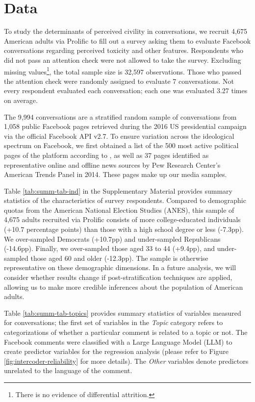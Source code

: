\documentclass{article}
\begin{document}
\section{Data}

To study the determinants of perceived civility in conversations, we recruit 4,675 American adults via Prolific to fill out a survey asking them to evaluate Facebook conversations regarding perceived toxicity and other features. Respondents who did not pass an attention check were not allowed to take the survey. Excluding missing values\footnote{There is no evidence of differential attrition.}, the total sample size is 32,597 observations. Those who passed the attention check were randomly assigned to evaluate 7 conversations. Not every respondent evaluated each conversation; each one was evaluated 3.27 times on average. 

The 9,994 conversations are a stratified random sample of conversations from 1,058 public Facebook pages retrieved during the 2016 US presidential campaign via the official Facebook API v2.7. To ensure variation across the ideological spectrum on Facebook, we first obtained a list of the 500 most active political pages of the platform according to \citet{bakshy_exposure_2015}, as well as 37 pages identified as representative online and offline news sources by Pew Research Center’s American Trends Panel in 2014. These pages make up our media samples.

Table \ref{tab:summ-tab-ind} in the Supplementary Material provides summary statistics of the characteristics of survey respondents. Compared to demographic quotas from the American National Election Studies (ANES), this sample of 4,675 adults recruited via Prolific consists of more college-educated individuals (+10.7 percentage points) than those with a high school degree or less (-7.3pp). We over-sampled Democrats (+10.7pp) and under-sampled Republicans (-14.6pp). Finally, we over-sampled those aged 33 to 44 (+9.4pp), and under-sampled those aged 60 and older (-12.3pp). The sample is otherwise representative on these demographic dimensions. In a future analysis, we will consider whether results change if post-stratification techniques are applied, allowing us to make more credible inferences about the population of American adults.


Table \ref{tab:summ-tab-topics} provides summary statistics of variables measured for conversations; the first set of variables in the \textit{Topic} category refers to categorizations of whether a particular comment is related to a topic or not. The Facebook comments were classified with a Large Language Model (LLM) to create predictor variables for the regression analysis (please refer to Figure \ref{fig:intercoder-reliability} for more details). The \textit{Other} variables denote predictors unrelated to the language of the comment.
\end{document}
